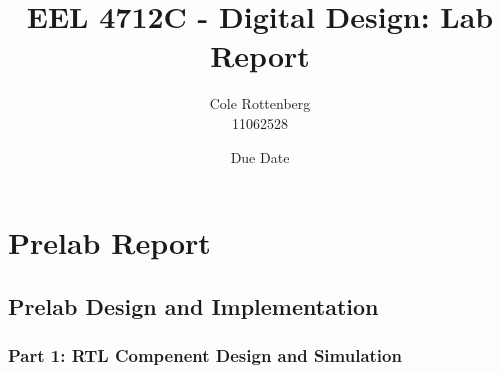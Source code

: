 \documentclass{article}
\title{EEL 4712C - Digital Design: Lab Report}
\author{Cole Rottenberg \\ 11062528}
\date{Due Date}
\begin{document}
\maketitle

\section*{Prelab Report}

\subsection*{Prelab Design and Implementation}

\subsubsection*{Part 1: RTL Compenent Design and Simulation}
\end{document}
